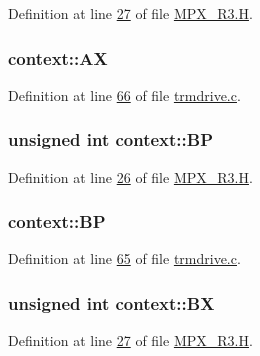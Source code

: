 Definition at line \hyperlink{_m_p_x___r3_8_h_source_l00027}{27} of file \hyperlink{_m_p_x___r3_8_h_source}{MPX\_\-R3.H}.

\hypertarget{structcontext_a81fe87b5153fb61ade5c1e88a74807f4}{
\subsubsection[{AX}]{ {\bf context::AX}}}
\label{structcontext_a81fe87b5153fb61ade5c1e88a74807f4}


Definition at line \hyperlink{trmdrive_8c_source_l00066}{66} of file \hyperlink{trmdrive_8c_source}{trmdrive.c}.

\hypertarget{structcontext_a036a2e025f269d00b084e69796f45680}{
\subsubsection[{BP}]{\setlength{\rightskip}{0pt plus 5cm}unsigned int {\bf context::BP}}}
\label{structcontext_a036a2e025f269d00b084e69796f45680}


Definition at line \hyperlink{_m_p_x___r3_8_h_source_l00026}{26} of file \hyperlink{_m_p_x___r3_8_h_source}{MPX\_\-R3.H}.

\hypertarget{structcontext_ace4c0a7cb726c8222771263a8045ca6f}{
\subsubsection[{BP}]{ {\bf context::BP}}}
\label{structcontext_ace4c0a7cb726c8222771263a8045ca6f}


Definition at line \hyperlink{trmdrive_8c_source_l00065}{65} of file \hyperlink{trmdrive_8c_source}{trmdrive.c}.

\hypertarget{structcontext_acd2a72acb8e494afd3c30c3614e567ee}{
\subsubsection[{BX}]{\setlength{\rightskip}{0pt plus 5cm}unsigned int {\bf context::BX}}}
\label{structcontext_acd2a72acb8e494afd3c30c3614e567ee}


Definition at line \hyperlink{_m_p_x___r3_8_h_source_l00027}{27} of file \hyperlink{_m_p_x___r3_8_h_source}{MPX\_\-R3.H}.


